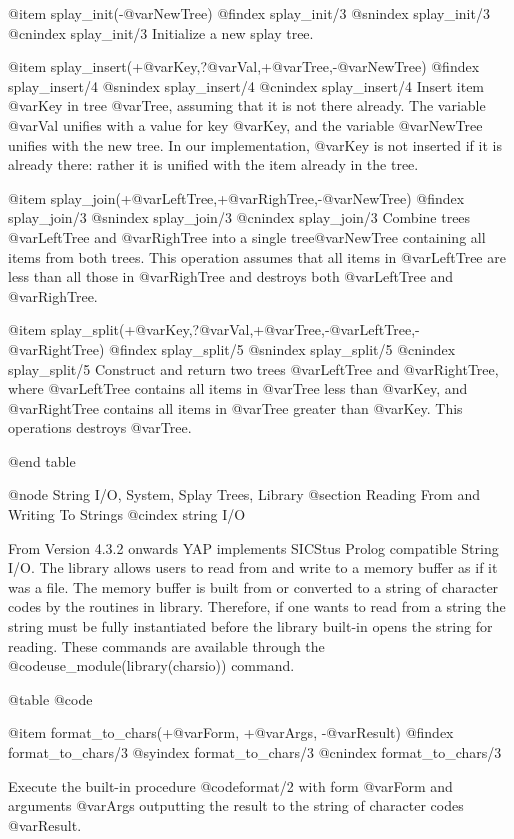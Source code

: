 {{{{{{{{@item splay_init(-@var{NewTree})
@findex splay_init/3
@snindex splay_init/3
@cnindex splay_init/3
Initialize a new splay tree.

@item splay_insert(+@var{Key},?@var{Val},+@var{Tree},-@var{NewTree})
@findex splay_insert/4
@snindex splay_insert/4
@cnindex splay_insert/4
Insert item @var{Key} in tree @var{Tree}, assuming that it is not
there already. The variable @var{Val} unifies with a value for key
@var{Key}, and the variable @var{NewTree} unifies with the new
tree. In our implementation, @var{Key} is not inserted if it is
already there: rather it is unified with the item already in the tree.

@item splay_join(+@var{LeftTree},+@var{RighTree},-@var{NewTree})
@findex splay_join/3
@snindex splay_join/3
@cnindex splay_join/3
Combine trees @var{LeftTree} and @var{RighTree} into a single
tree@var{NewTree} containing all items from both trees. This operation
assumes that all items in @var{LeftTree} are less than all those in
@var{RighTree} and destroys both @var{LeftTree} and @var{RighTree}.

@item splay_split(+@var{Key},?@var{Val},+@var{Tree},-@var{LeftTree},-@var{RightTree})
@findex splay_split/5
@snindex splay_split/5
@cnindex splay_split/5
Construct and return two trees @var{LeftTree} and @var{RightTree},
where @var{LeftTree} contains all items in @var{Tree} less than
@var{Key}, and @var{RightTree} contains all items in @var{Tree}
greater than @var{Key}. This operations destroys @var{Tree}.

@end table

@node String I/O, System, Splay Trees, Library
@section Reading From and Writing To Strings
@cindex string I/O

From Version 4.3.2 onwards YAP implements SICStus Prolog compatible
String I/O. The library allows users to read from and write to a memory
buffer as if it was a file. The memory buffer is built from or converted
to a string of character codes by the routines in library. Therefore, if
one wants to read from a string the string must be fully instantiated
before the library built-in opens the string for reading. These commands
are available through the @code{use_module(library(charsio))} command.

@table @code

@item format_to_chars(+@var{Form}, +@var{Args}, -@var{Result})
@findex format_to_chars/3
@syindex format_to_chars/3
@cnindex format_to_chars/3

Execute the built-in procedure @code{format/2} with form @var{Form} and
arguments @var{Args} outputting the result to the string of character
codes @var{Result}.

}}}}}}}}
